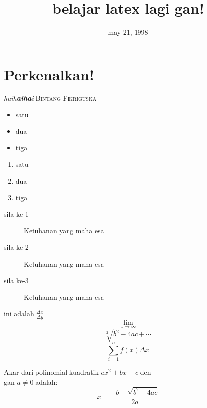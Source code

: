 \documentclass{article}
\date{may 21, 1998}
\title{belajar latex lagi gan!}
\begin{document}
	\maketitle
	\section{Perkenalkan!}
	\emph{haih\textbf{aiha}i}
	\textsc{Bintang Fikriguska}
	\begin{itemize}
		\item satu
		\item dua
		\item tiga
	\end{itemize}

	\begin{enumerate}
		\item satu
		\item dua
		\item tiga
	\end{enumerate}

	\begin{description}
		\item[sila ke-1] Ketuhanan yang maha esa
		\item[sila ke-2] Ketuhanan yang maha esa
		\item[sila ke-3] Ketuhanan yang maha esa
	\end{description}

	ini adalah $ \frac{\Delta x}{\Delta y} $
	$$ \lim_{x \to \infty} $$
	$$ \sqrt[2]{b^2-4ac+\cdots}$$
	$$ \sum_{i=1}^{n}f(x)\Delta x$$

	Akar dari polinomial kuadratik $ ax^2 + bx + c$ den\\gan $a \neq 0$ adalah: 
	$$ x = \frac{-b \pm \sqrt{b^2 - 4ac}}{2a} $$
\end{document}
